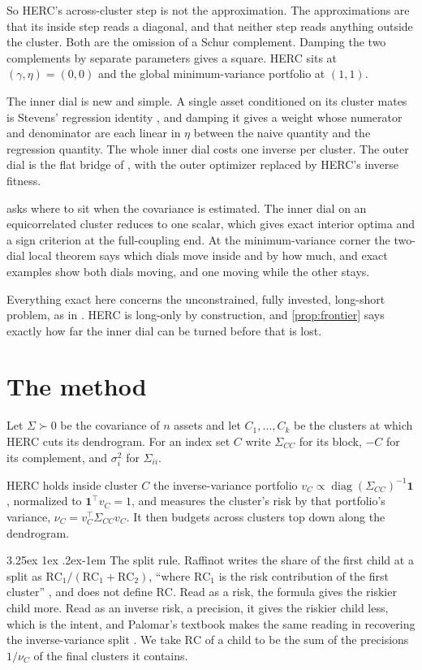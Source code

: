 \documentclass[11pt]{article}
\makeatletter
\renewcommand\paragraph{\@startsection{paragraph}{4}{\z@}%
  {3.25ex \@plus1ex \@minus.2ex}{-1em}%
  {\normalfont\normalsize\itshape}}
\newcommand{\ones}{\mathbf{1}}
\DeclareMathOperator{\diag}{diag}
\makeatother
\begin{document}
So HERC's across-cluster step is not the approximation. The approximations
are that its inside step reads a diagonal, and that neither step reads
anything outside the cluster. Both are the omission of a Schur complement.
Damping the two complements by separate parameters gives a square. HERC
sits at $(\gamma,\eta)=(0,0)$ and the global minimum-variance portfolio at
$(1,1)$.

The inner dial is new and simple. A single asset conditioned on its cluster
mates is Stevens' regression identity \cite{stevens1998}, and damping it
gives a weight whose numerator and denominator are each linear in $\eta$
between the naive quantity and the regression quantity. The whole inner
dial costs one inverse per cluster. The outer dial is the flat bridge of
\cite{cotton2026nco}, with the outer optimizer replaced by HERC's inverse
fitness.

 asks where to sit when the covariance is estimated. The
inner dial on an equicorrelated cluster reduces to one scalar, which gives
exact interior optima and a sign criterion at the full-coupling end. At the
minimum-variance corner the two-dial local theorem says which dials move
inside and by how much, and exact examples show both dials moving, and one
moving while the other stays.

Everything exact here concerns the unconstrained, fully invested,
long-short problem, as in \cite{cotton2024schur,cotton2026bridge}. HERC is
long-only by construction, and \cref{prop:frontier} says exactly how far
the inner dial can be turned before that is lost.

\section{The method}

Let $\Sigma\succ0$ be the covariance of $n$ assets and let $C_1,\dots,C_k$
be the clusters at which HERC cuts its dendrogram. For an index set $C$
write $\Sigma_{CC}$ for its block, $-C$ for its complement, and $\sigma_i^2$
for $\Sigma_{ii}$.

HERC holds inside cluster $C$ the inverse-variance portfolio
$v_C\propto\diag(\Sigma_{CC})^{-1}\ones$, normalized to $\ones^\top v_C=1$,
and measures the cluster's risk by that portfolio's variance,
$\nu_C=v_C^\top\Sigma_{CC}v_C$. It then budgets across clusters top down
along the dendrogram.

\paragraph{The split rule.} Raffinot writes the share of the first child at
a split as $\mathrm{RC}_1/(\mathrm{RC}_1+\mathrm{RC}_2)$, ``where
$\mathrm{RC}_1$ is the risk contribution of the first cluster''
\cite{raffinot2018}, and does not define $\mathrm{RC}$. Read as a risk, the
formula gives the riskier child more. Read as an inverse risk, a precision,
it gives the riskier child less, which is the intent, and Palomar's
textbook makes the same reading in recovering the inverse-variance split
\cite{palomar2025}. We take $\mathrm{RC}$ of a child to be the sum of the
precisions $1/\nu_C$ of the final clusters it contains.
\end{document}
